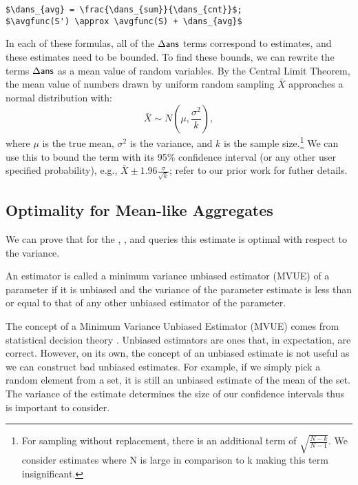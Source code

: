 \begin{lstlisting}[mathescape,basicstyle={\scriptsize}]
$\dans_{avg} = \frac{\dans_{sum}}{\dans_{cnt}}$;
$\avgfunc(S') \approx \avgfunc(S) + \dans_{avg}$
\end{lstlisting}

In each of these formulas, all of the $\Delta\textsf{ans}$ terms correspond to estimates, and these estimates need to be bounded.
To find these bounds, we can rewrite the terms $\Delta\textsf{ans}$ as a mean value of random variables.
By the Central Limit Theorem, the mean value of numbers drawn by uniform random sampling $\bar{X}$ approaches a normal distribution with:
\[
\bar{X} \sim N(\mu,\frac{\sigma^2}{k}),
\]
where $\mu$ is the true mean, $\sigma^2$ is the variance, and $k$ is the sample size.\footnote{\scriptsize For sampling without replacement, there is an additional term of $\sqrt{\frac{N-k}{N-1}}$. We consider estimates where N is large in comparison to k making this term insignificant.}
We can use this to bound the term with its 95\% confidence interval (or any other user specified probability), e.g., $\bar{X} \pm 1.96 \frac{\sigma}{\sqrt{k}}$; refer to our prior work \cite{wang1999sample} for futher details.

\subsection{Optimality for Mean-like Aggregates}
We can prove that for the \sumfunc, \countfunc, and \avgfunc queries this estimate is optimal with respect to the variance.
\begin{proposition}
An estimator is called a minimum variance unbiased estimator (MVUE) of a parameter if it is unbiased and the variance of the parameter estimate is less than or equal to that of any other unbiased estimator of the parameter.
\end{proposition}
The concept of a Minimum Variance Unbiased Estimator (MVUE) comes from statistical decision theory \cite{cox1979theoretical}.
Unbiased estimators are ones that, in expectation, are correct.
However, on its own, the concept of an unbiased estimate is not useful as we can construct bad unbiased estimates.
For example, if we simply pick a random element from a set, it is still an unbiased estimate of the mean of the set.
The variance of the estimate determines the size of our confidence intervals thus is important to consider.

